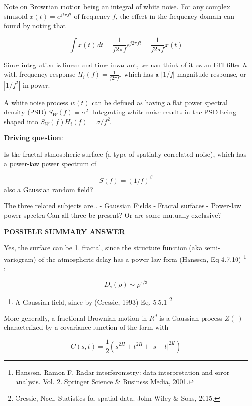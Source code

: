 \documentclass{utexasthesis}
\begin{document}
Note on Brownian motion being an integral of white noise.
For any complex sinusoid $x(t) = e^{j2 \pi f t}$ of frequency $f$, the effect in the frequency domain can found by noting that 

\begin{equation}
\int x(t) \, dt = \frac{1}{j 2 \pi f} e^{j2\pi f t} = \frac{1}{j 2 \pi f} x(t)
\end{equation}

Since integration is linear and time invariant, we can think of it as an LTI filter $h$ with frequency response $H_i(f) = \frac{1}{j 2 \pi f} $, which has a $|1/f|$ magnitude response, or $|1/f^2|$ in power.

A white noise process $w(t)$ can be defined as having a flat power spectral density (PSD) $S_W(f) = \sigma^2$. Integrating white noise results in the PSD being shaped into $S_W(f) H_i(f) = \sigma / f^2$.

\textbf{Driving question}:

Is the fractal atmospheric surface (a type of spatially correlated
noise), which has a power-law power spectrum of

\[S(f) = (1/f)^{\beta}\] also a Gaussian random field?

The three related subjects are\ldots{} - Gaussian Fields - Fractal
surfaces - Power-law power spectra Can all three be present? Or are some
mutually exclusive?

\textbf{POSSIBLE SUMMARY ANSWER}

Yes, the surface can be 1. fractal, since the structure function (aka
semi-variogram) of the atmospheric delay has a power-law form (Hanssen,
Eq 4.7.10) \footnote{Hanssen, Ramon F. Radar interferometry: data
  interpretation and error analysis. Vol. 2. Springer Science \&
  Business Media, 2001.} :

\[D_s(\rho) \sim \rho^{5/3}\]

\begin{enumerate}

\item
  A Gaussian field, since by (Cressie, 1993) Eq. 5.5.1 \footnote{Cressie,
    Noel. Statistics for spatial data. John Wiley \& Sons, 2015.},
\end{enumerate}

More generally, a fractional Brownian motion in \(R^d\) is a Gaussian
process \(Z(\cdot)\) characterized by a covariance function of the form
with

\[C(s, t) = \frac{1}{2}\left(s^{2H} + t^{2H} + |s-t|^{2H}\right)\]
\end{document}
